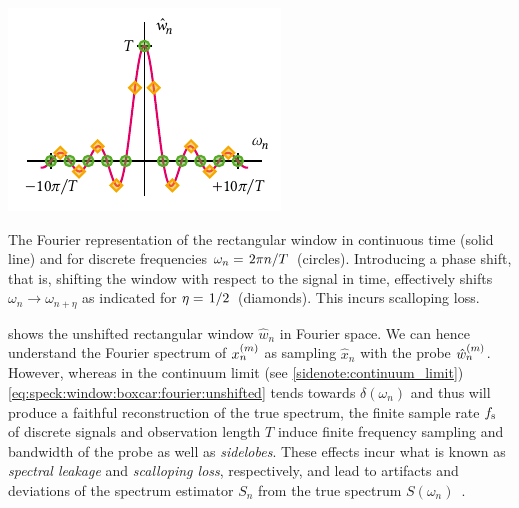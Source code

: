 \begin{marginfigure}
    \centering
    \includegraphics{img/pdf/spectrometer/rect}
    \caption[]{
        The Fourier representation of the rectangular window in continuous time (solid line) and for discrete frequencies $\omega_n = \flatfrac{2\pi n}{T}$ (circles).
        Introducing a phase shift, that is, shifting the window with respect to the signal in time, effectively shifts $\omega_n \to \omega_{n+\eta}$ as indicated for $\eta=\flatfrac{1}{2}$ (diamonds).
        This incurs scalloping loss.
    }
    \label{fig:speck:boxcar_fourier}
\end{marginfigure}

 shows the unshifted rectangular window $\hat{w}_n$ in Fourier space.
We can hence understand the Fourier spectrum of $x_n^{(m)}$ as sampling $\hat{x}_n$ with the probe $\hat{w}_n^{(m)}$.
However, whereas in the continuum limit (see \cref{sidenote:continuum_limit}) \cref{eq:speck:window:boxcar:fourier:unshifted} tends towards $\delta(\omega_n)$ and thus will produce a faithful reconstruction of the true spectrum, the finite sample rate $f_{\mathrm{s}}$ of discrete signals and observation length $T$ induce finite frequency sampling and bandwidth of the probe as well as \emph{sidelobes}.
These effects incur what is known as \emph{spectral leakage} and \emph{scalloping loss}, respectively, and lead to artifacts and deviations of the spectrum estimator $S_n$ from the true spectrum $S(\omega_n)$~\cite{Harris1978,Koopmans1995}.

